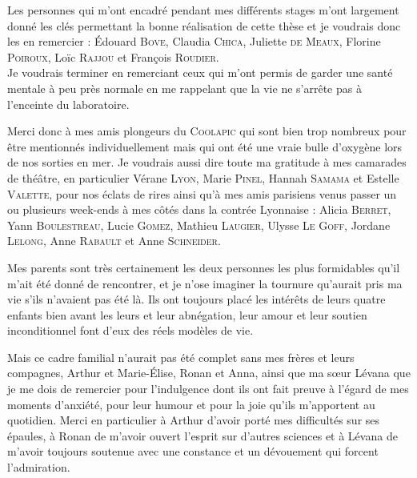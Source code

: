 Les personnes qui m'ont encadré pendant mes différents stages m'ont largement donné les clés permettant la bonne réalisation de cette thèse et je voudrais donc les en remercier : 
\'Edouard \textsc{Bove},
Claudia \textsc{Chica},
Juliette \textsc{de Meaux},
Florine \textsc{Poiroux},
Loïc \textsc{Rajjou} et
François \textsc{Roudier}.\\








Je voudrais terminer en remerciant ceux qui m'ont permis de garder une santé mentale à peu près normale en me rappelant que la vie ne s'arrête pas à l'enceinte du laboratoire.

Merci donc à mes amis plongeurs du \textsc{Coolapic} qui sont bien trop nombreux pour être mentionnés individuellement mais qui ont été une vraie bulle d'oxygène lors de nos sorties en mer.
Je voudrais aussi dire toute ma gratitude à mes camarades de thé\^atre, en particulier Vérane \textsc{Lyon}, Marie \textsc{Pinel}, Hannah \textsc{Samama} et Estelle \textsc{Valette}, pour nos éclats de rires ainsi qu'à mes amis parisiens venus passer un ou plusieurs week-ends à mes côtés dans la contrée Lyonnaise : Alicia \textsc{Berret}, Yann \textsc{Boulestreau}, Lucie \textsc{Gomez}, Mathieu \textsc{Laugier}, Ulysse \textsc{Le Goff}, Jordane \textsc{Lelong}, Anne \textsc{Rabault} et Anne \textsc{Schneider}.


Mes parents sont très certainement les deux personnes les plus formidables qu'il m'ait été donné de rencontrer, et je n'ose imaginer la tournure qu'aurait pris ma vie s'ils n'avaient pas été là.
Ils ont toujours placé les intérêts de leurs quatre enfants bien avant les leurs et leur abnégation, leur amour et leur soutien inconditionnel font d'eux des réels modèles de vie.


Mais ce cadre familial n'aurait pas été complet sans mes frères et leurs compagnes, Arthur et Marie-\'Elise, Ronan et Anna, ainsi que ma sœur Lévana que je me dois de remercier pour l'indulgence dont ils ont fait preuve à l'égard de mes moments d'anxiété, pour leur humour et pour la joie qu'ils m'apportent au quotidien.
Merci en particulier à Arthur d'avoir porté mes difficultés sur ses épaules, à Ronan de m'avoir ouvert l'esprit sur d'autres sciences et à Lévana de m'avoir toujours soutenue avec une constance et un dévouement qui forcent l'admiration.


